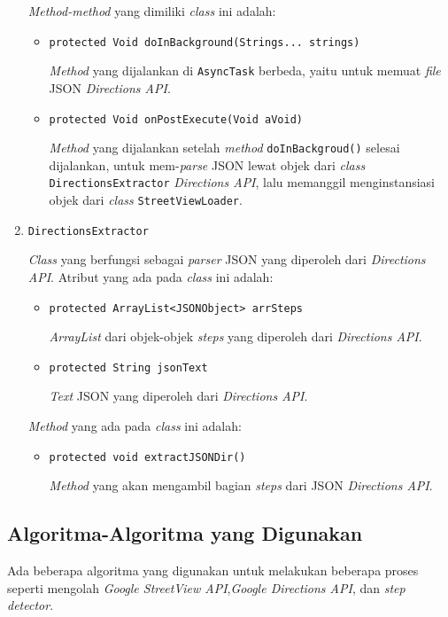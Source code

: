 \begin{enumerate}
	\textit{Method-method} yang dimiliki \textit{class} ini adalah:
	
	\begin{itemize}
		\item \texttt{protected Void doInBackground(Strings... strings)}
		
		\textit{Method} yang dijalankan di \texttt{AsyncTask} berbeda, yaitu untuk memuat \textit{file} JSON \textit{Directions API}.
		\item \texttt{protected Void onPostExecute(Void aVoid)}
		
		\textit{Method} yang dijalankan setelah \textit{method} \texttt{doInBackgroud()} selesai dijalankan, untuk mem-\textit{parse} JSON lewat objek dari \textit{class} \texttt{DirectionsExtractor} \textit{Directions API}, lalu memanggil menginstansiasi objek dari \textit{class} \texttt{StreetViewLoader}. 
	\end{itemize} 
	
	\item \texttt{DirectionsExtractor}
	
	\textit{Class} yang berfungsi sebagai \textit{parser} JSON yang diperoleh dari \textit{Directions API}. Atribut yang ada pada \textit{class} ini adalah:
	
	\begin{itemize}
		\item \texttt{protected ArrayList<JSONObject> arrSteps}
		
		\textit{ArrayList} dari objek-objek \textit{steps} yang diperoleh dari \textit{Directions API}.
		\item \texttt{protected String jsonText}
		
		\textit{Text} JSON yang diperoleh dari \textit{Directions API}. 
	\end{itemize}
	
	\textit{Method} yang ada pada \textit{class} ini adalah:
	
	\begin{itemize}
		\item \texttt{protected void extractJSONDir()} 
		
		\textit{Method} yang akan mengambil bagian \textit{steps} dari JSON \textit{Directions API}.	
	\end{itemize}
\end{enumerate} 

\subsection{Algoritma-Algoritma yang Digunakan}
Ada beberapa algoritma yang digunakan   untuk melakukan beberapa proses seperti mengolah \textit{Google StreetView API},\textit{Google Directions API}, dan 
 \textit{step detector}.

